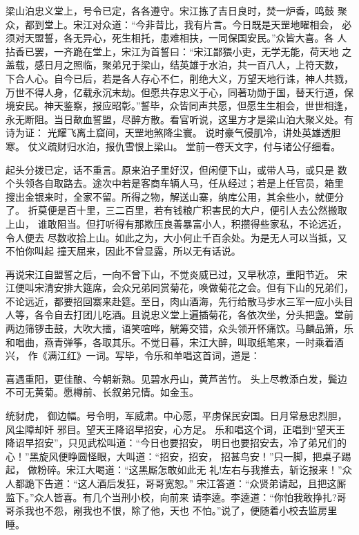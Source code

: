 梁山泊忠义堂上，号令已定，各各遵守。宋江拣了吉日良时，焚一炉香，鸣鼓
聚众，都到堂上。宋江对众道：“今非昔比，我有片言。今日既是天罡地曜相会，
必须对天盟誓，各无异心，死生相托，患难相扶，一同保国安民。”众皆大喜。各
人拈香已罢，一齐跪在堂上，宋江为首誓曰：“宋江鄙猥小吏，无学无能，荷天地
之盖载，感日月之照临，聚弟兄于梁山，结英雄于水泊，共一百八人，上符天数，
下合人心。自今已后，若是各人存心不仁，削绝大义，万望天地行诛，神人共戮，
万世不得人身，亿载永沉末劫。但愿共存忠义于心，同著功勋于国，替天行道，保
境安民。神天鉴察，报应昭彰。”誓毕，众皆同声共愿，但愿生生相会，世世相逢，
永无断阻。当日歃血誓盟，尽醉方散。看官听说，这里方才是梁山泊大聚义处。有
诗为证：
光耀飞离土窟间，天罡地煞降尘寰。
说时豪气侵肌冷，讲处英雄透胆寒。
仗义疏财归水泊，报仇雪恨上梁山。
堂前一卷天文字，付与诸公仔细看。

起头分拨已定，话不重言。原来泊子里好汉，但闲便下山，或带人马，或只是
数个头领各自取路去。途次中若是客商车辆人马，任从经过；若是上任官员，箱里
搜出金银来时，全家不留。所得之物，解送山寨，纳库公用，其余些小，就便分了。
折莫便是百十里，三二百里，若有钱粮广积害民的大户，便引人去公然搬取上山，
谁敢阻当。但打听得有那欺压良善暴富小人，积攒得些家私，不论远近，令人便去
尽数收拾上山。如此之为，大小何止千百余处。为是无人可以当抵，又不怕你叫起
撞天屈来，因此不曾显露，所以无有话说。

再说宋江自盟誓之后，一向不曾下山，不觉炎威已过，又早秋凉，重阳节近。
宋江便叫宋清安排大筵席，会众兄弟同赏菊花，唤做菊花之会。但有下山的兄弟们，
不论远近，都要招回寨来赴筵。至日，肉山酒海，先行给散马步水三军一应小头目
人等，各令自去打团儿吃酒。且说忠义堂上遍插菊花，各依次坐，分头把盏。堂前
两边筛锣击鼓，大吹大擂，语笑喧哗，觥筹交错，众头领开怀痛饮。马麟品箫，乐
和唱曲，燕青弹筝，各取其乐。不觉日暮，宋江大醉，叫取纸笔来，一时乘着酒兴，
作《满江红》一词。写毕，令乐和单唱这首词，道是：

喜遇重阳，更佳酿、今朝新熟。见碧水丹山，黄芦苦竹。
头上尽教添白发，鬓边不可无黄菊。愿樽前、长叙弟兄情。如金玉。

统豺虎，
御边幅。号令明，军威肃。中心愿，平虏保民安国。日月常悬忠烈胆，风尘障却奸
邪目。望天王降诏早招安，心方足。
乐和唱这个词，正唱到“望天王降诏早招安”，只见武松叫道：“今日也要招安，
明日也要招安去，冷了弟兄们的心！”黑旋风便睁圆怪眼，大叫道：“招安，招安，
招甚鸟安！”只一脚，把桌子踢起，做粉碎。宋江大喝道：“这黑厮怎敢如此无
礼!左右与我推去，斩讫报来！”众人都跪下告道：“这人酒后发狂，哥哥宽恕。”
宋江答道：“众贤弟请起，且把这厮监下。”众人皆喜。有几个当刑小校，向前来
请李逵。李逵道：“你怕我敢挣扎?哥哥杀我也不怨，剐我也不恨，除了他，天也
不怕。”说了，便随着小校去监房里睡。

